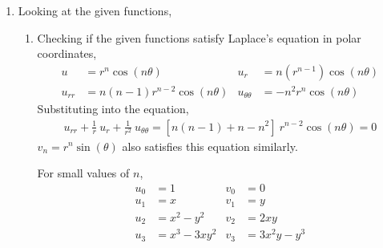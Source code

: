 \begin{enumerate}
    \item Looking at the given functions,
          \begin{enumerate}
              \item Checking if the given functions satisfy Laplace's equation in polar
                    coordinates,
                    \begin{align}
                        u                & = r^n \cos(n\theta)           &
                        u_r              & = n(r^{n-1}) \cos(n\theta)      \\
                        u_{rr}           & = n(n-1)r^{n-2} \cos(n\theta) &
                        u_{\theta\theta} & = -n^2r^n \cos(n\theta)
                    \end{align}
                    Substituting into the equation,
                    \begin{align}
                        u_{rr} + \frac{1}{r}\ u_r + \frac{1}{r^2}\ u_{\theta\theta}
                        = [n(n-1) + n - n^2]\ r^{n-2} \cos(n\theta) = 0
                    \end{align}
                    $ v_n = r^n \sin(\theta) $ also satisfies this equation similarly.
                    \par
                    For small values of $ n $,
                    \begin{align}
                        u_0 & = 1           & v_0 & = 0           \\
                        u_1 & = x           & v_1 & = y           \\
                        u_2 & = x^2 - y^2   & v_2 & = 2xy         \\
                        u_3 & = x^3 - 3xy^2 & v_3 & = 3x^2y - y^3
                    \end{align}


\end{enumerate}
\end{enumerate}
